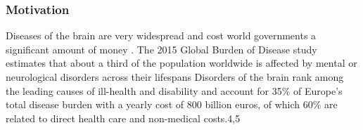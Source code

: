 

\subsubsection{Motivation}
Diseases of the brain are very widespread and cost world governments a significant amount of money \cite{who}.
The 2015 Global Burden of Disease study estimates that about a third of the population worldwide is affected by mental or neurological disorders across their lifespans
Disorders of the brain rank among the leading causes of ill-health and disability and account for 35\% of Europe’s total disease burden with a yearly cost of 800 billion euros, of which 60\% are related to direct health care and non-medical costs.4,5 %

